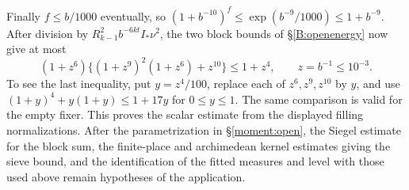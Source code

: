 Finally \(f\le b/1000\) eventually, so
\((1+b^{-10})^f\le\exp(b^{-9}/1000)\le 1+b^{-9}\).
After division by \(R_{k-1}^2 b^{-6kt} I_*\nu^2\), the two block
bounds of \S\ref{B:openenergy} now give at most
\[
 (1+z^6)\{(1+z^9)^2(1+z^6)+z^{10}\}\le 1+z^4,
 \qquad z=b^{-1}\le10^{-3}.
\]
To see the last inequality, put \(y=z^4/100\), replace each of
\(z^6,z^9,z^{10}\) by \(y\), and use
\((1+y)^4+y(1+y)\le1+17y\) for \(0\le y\le1\).
The same comparison is valid for the empty fixer. This proves the
scalar estimate from the displayed filling normalizations. After the parametrization in \S\ref{moment:open}, the Siegel estimate for the block sum,
the finite-place and archimedean kernel estimates giving the sieve
bound, and the identification of the fitted measures and level
with those used above remain hypotheses of the application.
